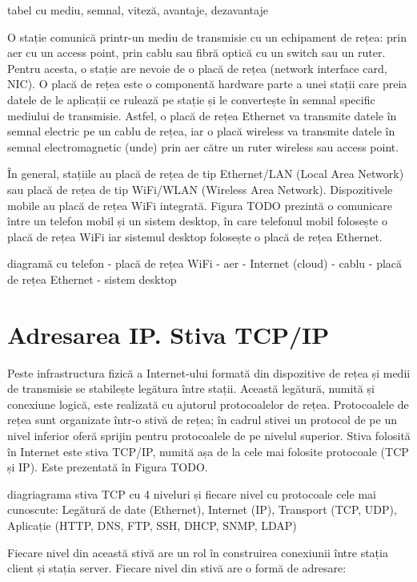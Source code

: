 tabel cu mediu, semnal, viteză, avantaje, dezavantaje

O stație comunică printr-un mediu de transmisie cu un echipament de rețea: prin aer cu un access point, prin cablu sau fibră optică cu un switch sau un ruter. Pentru acesta, o stație are nevoie de o placă de rețea (network interface card, NIC). O placă de rețea este o componentă hardware parte a unei stații care preia datele de le aplicații ce rulează pe stație și le convertește în semnal specific mediului de transmisie. Astfel, o placă de rețea Ethernet va transmite datele în semnal electric pe un cablu de rețea, iar o placă wireless va transmite datele în semnal electromagnetic (unde) prin aer către un ruter wireless sau access point.

În general, stațiile au placă de rețea de tip Ethernet/LAN (Local Area Network) sau placă de rețea de tip WiFi/WLAN (Wireless Area Network). Dispozitivele mobile au placă de rețea WiFi integrată. Figura TODO prezintă o comunicare între un telefon mobil și un sistem desktop, în care telefonul mobil folosește o placă de rețea WiFi iar sistemul desktop folosește o placă de rețea Ethernet.

diagramă cu telefon - placă de rețea WiFi - aer - Internet (cloud) - cablu - placă de rețea Ethernet - sistem desktop

\section{Adresarea IP. Stiva TCP/IP}
\label{sec:net:tcp-ip}

Peste infrastructura fizică a Internet-ului formată din dispozitive de rețea și medii de transmisie se stabilește legătura între stații. Această legătură, numită și conexiune logică, este realizată cu ajutorul protocoalelor de rețea. Protocoalele de rețea sunt organizate într-o stivă de rețea; în cadrul stivei un protocol de pe un nivel inferior oferă sprijin pentru protocoalele de pe nivelul superior. Stiva folosită în Internet este stiva TCP/IP, numită așa de la cele mai folosite protocoale (TCP și IP). Este prezentată în Figura TODO.

diagriagrama stiva TCP cu 4 niveluri și fiecare nivel cu protocoale cele mai cunoscute: Legătură de date (Ethernet), Internet (IP), Transport (TCP, UDP), Aplicație (HTTP, DNS, FTP, SSH, DHCP, SNMP, LDAP)

Fiecare nivel din această stivă are un rol în construirea conexiunii între stația client și stația server. Fiecare nivel din stivă are o formă de adresare:

